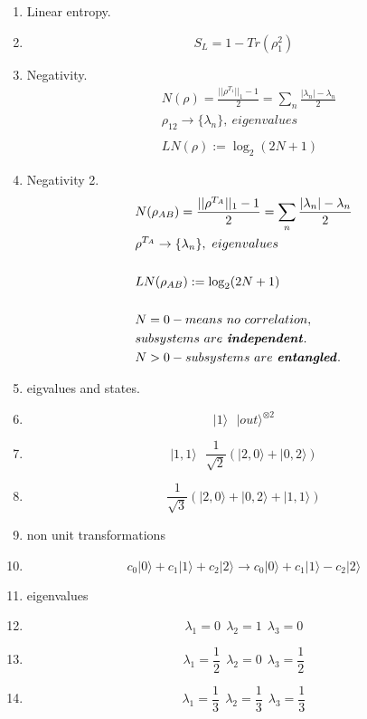 \documentclass[12pt]{article}
\begin{document}
\begin{enumerate}
\item Linear entropy.
\item $$ S_{L} =  1 - Tr(\rho_{1}^2) $$

\item Negativity.
\begin{align*}
& N(\rho) = \frac{||\rho^{T_{1}}||_{1} - 1}{2}  =\sum_{n}  \frac{|\lambda_{n}| - \lambda_{n}}{2} \\
& \rho_{12}   \rightarrow  \{ \lambda_{n} \}, \ eigenvalues  \\
\\
& LN(\rho) := \log_{2}(2N + 1)
\end{align*}

\item Negativity 2.
\begin{align*}
& N(\rho_{AB}) = \frac{||\rho^{T_{A}}||_{1} - 1}{2}  =\sum_{n}  \frac{|\lambda_{n}| - \lambda_{n}}{2} \\
& \rho^{T_{A}}   \rightarrow  \{ \lambda_{n} \}, \ eigenvalues  \\
\\
& LN(\rho_{AB}) := \log_{2}(2N + 1) \\
\\
& N = 0 - means \ no \ correlation, \\
& subsystems \ are \ \textbf{\textit{independent}}. \\
& N > 0 - subsystems \ are \ \textbf{\textit{entangled}}. \\
\end{align*}



\item eigvalues and states.

\item $$ |1\rangle   \ \ \ |out\rangle^{\otimes 2} $$

\item $$ |1,1\rangle   \ \ \ \frac{1}{\sqrt{2}}(|2,0\rangle + |0,2\rangle)  $$

\item $$  \frac{1}{\sqrt{3}}(|2,0\rangle + |0,2\rangle + |1,1\rangle )   $$

\item non unit transformations
\item $$  c_{0}|0\rangle  + c_{1}|1\rangle + c_{2}|2\rangle  \rightarrow  c_{0}|0\rangle  + c_{1}|1\rangle - c_{2}|2\rangle  $$

\item eigenvalues
\item $$  \lambda_{1} = 0  \ \ \lambda_{2} = 1  \ \  \lambda_{3} = 0 $$
\item $$  \lambda_{1} = \frac{1}{2}  \ \ \lambda_{2} = 0  \ \  \lambda_{3} = \frac{1}{2} $$
\item $$  \lambda_{1} = \frac{1}{3}  \ \ \lambda_{2} = \frac{1}{3}  \ \  \lambda_{3} = \frac{1}{3} $$


\end{enumerate}
\end{document}

